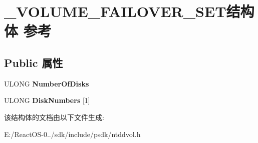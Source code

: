 \hypertarget{struct___v_o_l_u_m_e___f_a_i_l_o_v_e_r___s_e_t}{}\section{\+\_\+\+V\+O\+L\+U\+M\+E\+\_\+\+F\+A\+I\+L\+O\+V\+E\+R\+\_\+\+S\+E\+T结构体 参考}
\label{struct___v_o_l_u_m_e___f_a_i_l_o_v_e_r___s_e_t}
\subsection*{Public 属性}
\begin{DoxyCompactItemize}
\item 
\mbox{\label{struct___v_o_l_u_m_e___f_a_i_l_o_v_e_r___s_e_t_af0183b0927af3bd3aeaa47d2fc535444}} 
U\+L\+O\+NG {\bfseries Number\+Of\+Disks}
\item 
\mbox{\label{struct___v_o_l_u_m_e___f_a_i_l_o_v_e_r___s_e_t_aba9b36141d24255ab3d5c4d65759c817}} 
U\+L\+O\+NG {\bfseries Disk\+Numbers} \mbox{[}1\mbox{]}
\end{DoxyCompactItemize}


该结构体的文档由以下文件生成\+:\begin{DoxyCompactItemize}
\item 
E\+:/\+React\+O\+S-\/0../sdk/include/psdk/ntddvol.\+h\end{DoxyCompactItemize}
